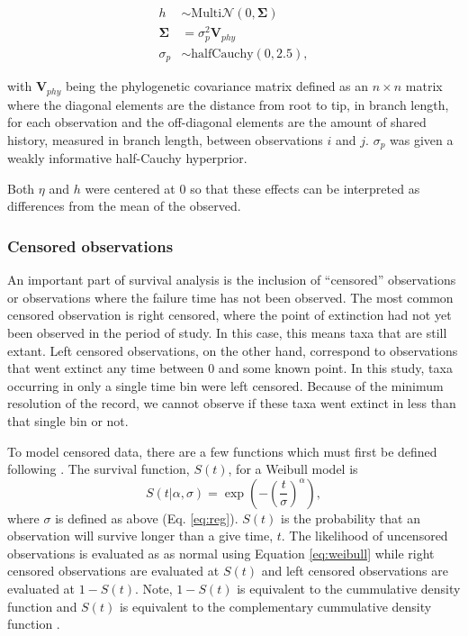 \documentclass[12pt,letterpaper]{article}
\begin{document}
\begin{align*}
  h &\sim \mathrm{Multi}\mathcal{N}(0, \mathbf{\Sigma}) \\
  \mathbf{\Sigma} &= \sigma_{p}^{2} \mathbf{V}_{phy} \\
  \sigma_{p} &\sim \mathrm{halfCauchy}(0, 2.5),
\end{align*}
 
with \(\mathbf{V}_{phy}\) being the phylogenetic covariance matrix defined as an \(n \times n\) matrix where the diagonal elements are the distance from root to tip, in branch length, for each observation and the off-diagonal elements are the amount of shared history, measured in branch length, between observations \(i\) and \(j\). \(\sigma_{p}\) was given a weakly informative half-Cauchy hyperprior. 

Both \(\eta\) and \(h\) were centered at 0 so that these effects can be interpreted as differences from the mean of the observed.


\subsubsection{Censored observations} \label{sec:censor}

An important part of survival analysis is the inclusion of ``censored'' observations \citep{Ibrahim2001,Klein2003} or observations where the failure time has not been observed. The most common censored observation is right censored, where the point of extinction had not yet been observed in the period of study. In this case, this means taxa that are still extant. Left censored observations, on the other hand, correspond to observations that went extinct any time between 0 and some known point. In this study, taxa occurring in only a single time bin were left censored. Because of the minimum resolution of the record, we cannot observe if these taxa went extinct in less than that single bin or not. 

To model censored data, there are a few functions which must first be defined following \citet{Klein2003}. The survival function, \(S(t)\), for a Weibull model is
\begin{equation}
  S(t | \alpha, \sigma) = \exp\left(-\left(\frac{t}{\sigma}\right)^{\alpha}\right),
  \label{eq:surv}
\end{equation}
where \(\sigma\) is defined as above (Eq. \ref{eq:reg}). \(S(t)\) is the probability that an observation will survive longer than a give time, \(t\). The likelihood of uncensored observations is evaluated as as normal using Equation \ref{eq:weibull} while right censored observations are evaluated at \(S(t)\) and left censored observations are evaluated at \(1 - S(t)\). Note, \(1 - S(t)\) is equivalent to the cummulative density function and \(S(t)\) is equivalent to the complementary cummulative density function \citep{Gelman2013d}.
\end{document}
